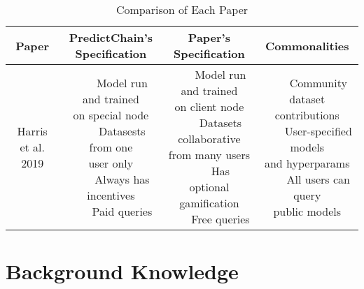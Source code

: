 \documentclass{article}
\newcommand{\tabitem}{~~\llap{\textbullet}~~}
\begin{document}
    \begin{table}[h!]
        \begin{center}
            \caption{Comparison of Each Paper}
            \label{tab:relatedSummary}
            \bgroup
            \def\arraystretch{3}
            \begin{tabular}{c|c|c|c}
                \textbf{Paper} & \makecell{\textbf{PredictChain's}\\\textbf{Specification}} & \textbf{Paper's Specification} & \textbf{Commonalities}\\
                \hline
                Harris et al. 2019\cite{sharingModels} &
                \makecell[l]{
                    \tabitem Model run and trained\\on special node\\
                    \tabitem Datasests from one\\user only\\
                    \tabitem Always has incentives\\
                    \tabitem Paid queries\\
                } & \makecell[l]{
                    \tabitem Model run and trained\\on client node\\
                    \tabitem Datasets collaborative\\from many users\\
                    \tabitem Has optional\\gamification\\
                    \tabitem Free queries\\
                } & \makecell[l]{
                    \tabitem Community dataset\\contributions\\
                    \tabitem User-specified models\\and hyperparams\\
                    \tabitem All users can query\\public models\\
                }\\
                \hline
            \end{tabular}
            \egroup
        \end{center}
    \end{table}

    \section{Background Knowledge}
\end{document}
